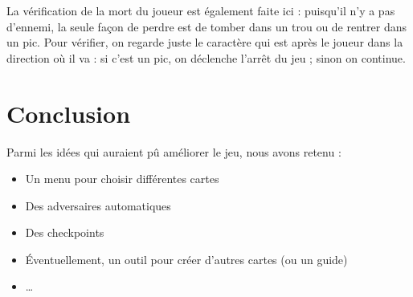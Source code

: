 \documentclass[12pt]{article}
\begin{document}
		La vérification de la mort du joueur est également faite ici : puisqu'il n'y a pas d'ennemi, la seule façon de perdre est de tomber dans un trou ou de rentrer dans un pic. Pour vérifier, on regarde juste le caractère qui est après le joueur dans la direction où il va : si c'est un pic, on déclenche l'arrêt du jeu ; sinon on continue.
		
		
		
	\newpage

	\section{Conclusion}

	Parmi les idées qui auraient pû améliorer le jeu, nous avons retenu :
	\begin{itemize}
		\item Un menu pour choisir différentes cartes
		\item Des adversaires automatiques
		\item Des checkpoints
		\item Éventuellement, un outil pour créer d'autres cartes (ou un guide)
		\item \dots
	\end{itemize}
		
\end{document}
